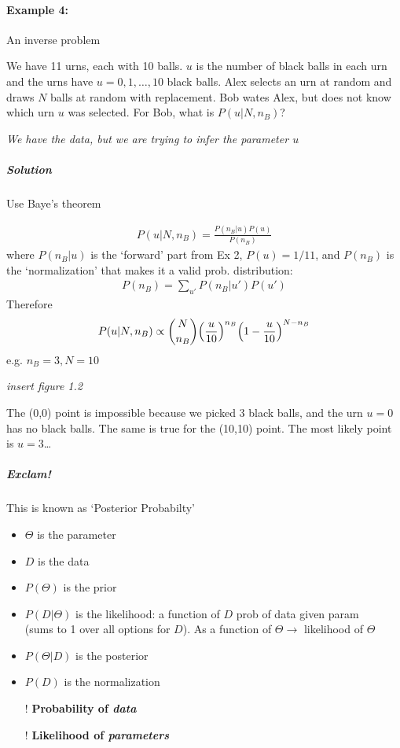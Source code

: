 \documentclass[../main.tex]{subfiles}
\begin{document}
\paragraph{Example 4:} An inverse problem

We have 11 urns, each with 10 balls. $u$ is the number of black balls in each urn and the
urns have $u = 0, 1, \dots, 10$ black balls. Alex selects an urn at random and draws $N$ balls 
at random with replacement.
Bob wates Alex, but does not know which urn $u$ was selected. For Bob, what is 
$P(u|N,n_B)$?

\emph{We have the data, but we are trying to infer the parameter $u$}

\subparagraph*{Solution} Use Baye's theorem

\begin{align*}
    P(u|N,n_B) = \frac{P(n_B|u) P(u)}{P(n_B)}
\end{align*}
where $P(n_B|u)$ is the `forward' part from Ex 2, $P(u) = 1/11$, and $P(n_B)$ is the `normalization'
that makes it a valid prob. distribution:
\begin{align*}
    P(n_B) = \sum_{u'} P(n_B|u') P(u')
\end{align*}
Therefore
\begin{align*}
    P(u|N,n_B) \propto \binom{N}{n_B} \qt(\frac{u}{10})^{n_B} \qt(1-\frac{u}{10})^{N-n_B}
\end{align*}
e.g. $n_B = 3, N = 10$

\emph{insert figure 1.2}

The (0,0) point is impossible because we picked 3 black balls, and the urn $u=0$ has no black balls.
The same is true for the (10,10) point. The most likely point is $u=3$\dots

\subparagraph*{Exclam!}

This is known as `Posterior Probabilty'
\begin{itemize}
    \item $\Theta$ is the parameter
    \item $D$ is the data
    \item $P(\Theta)$ is the prior
    \item $P(D|\Theta)$ is the likelihood: a function of $D$ prob of data given param \\
        (sums to 1 over all options for $D$). As a function of $\Theta \rightarrow$
        likelihood of $\Theta$ 
    \item $P(\Theta|D)$ is the posterior
    \item $P(D)$ is the normalization
    \item [!] \textbf{Probability of \emph{data}}
    \item [!] \textbf{Likelihood of \emph{parameters}}
\end{itemize}
\end{document}
